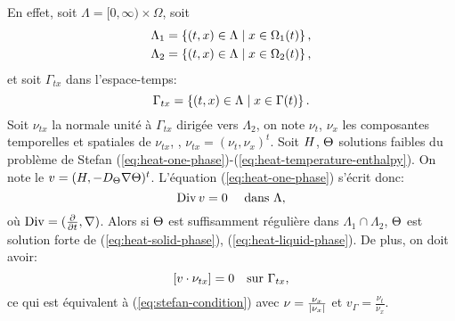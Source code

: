 En effet, soit $\Lambda = [0, \infty)\times \Omega$, soit
\begin{align}
  & \Lambda_1 = \left\{ (t, x)\in\Lambda\mid x \in \Omega_1(t) \right\},\\
  & \Lambda_2 = \left\{ (t, x)\in\Lambda\mid x \in \Omega_2(t) \right\},\\
\end{align}
et soit $\Gamma_{tx}$ dans l'espace-temps:
\begin{equation}
  \Gamma_{tx} = \left\{ (t, x) \in \Lambda\mid x \in \Gamma(t) \right\}.
\end{equation}
Soit $\nu_{tx}$ la normale unité à $\Gamma_{tx}$ dirigée vers
$\Lambda_2$, on note $\nu_t$, $\nu_x$ les composantes temporelles et
spatiales de $\nu_{tx}$, \ie, $\nu_{tx} = (\nu_t, \nu_x)^t$. Soit
$H$, $\Theta$ solutions faibles du problème de
Stefan
(\ref{eq:heat-one-phase})-(\ref{eq:heat-temperature-enthalpy}). On
note le $v = (H, -D_\Theta\nabla
\Theta)^t$. L'équation (\ref{eq:heat-one-phase}) s'écrit donc:
\begin{equation}\label{eq:space-time-divergence}
  \operatorname{Div} v = 0 \quad\text{ dans }\Lambda,
\end{equation}
où $\operatorname{Div} = (\frac{\partial}{\partial t}, \nabla)$. Alors si
$\Theta$ est suffisamment régulière dans
$\Lambda_1\cap\Lambda_2$, $\Theta$ est solution forte de
(\ref{eq:heat-solid-phase}), (\ref{eq:heat-liquid-phase}). De plus,
on doit avoir:
\begin{equation}
  \left[ v\cdot \nu_{tx} \right] = 0 \quad \text{sur } \Gamma_{tx},
\end{equation}
ce qui est équivalent à (\ref{eq:stefan-condition}) avec $\nu =
\frac{\nu_x}{\left\lvert \nu_x \right\rvert}$ et $v_\Gamma = \frac{\nu_t}{\nu_x}$.


